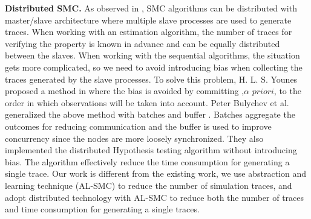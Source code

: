 \textbf{Distributed SMC.}
As observed in \cite{younes2005ymer}, SMC algorithms can be distributed with master/slave architecture where multiple slave processes are used to generate traces. When working with an estimation algorithm, the number of traces for verifying the property is known in advance and can be equally distributed between the slaves. When working with the sequential algorithms, the situation gets more complicated, so we need to avoid introducing bias when collecting the traces generated by the slave processes. To solve this problem, H. L. S. Younes proposed a method in \cite{Younes2004Planning} where the bias is avoided by committing ,$\alpha$ $priori$, to the order in which observations will be taken into account. Peter Bulychev et al. generalized the above method with batches and buffer \cite{Bulychev2012Checking}. Batches aggregate the outcomes for reducing communication and the buffer is used to improve concurrency since the nodes are more loosely synchronized. They also implemented the distributed Hypothesis testing algorithm without introducing bias. The algorithm effectively reduce the time consumption for generating a single trace. Our work is different from the existing work, we use abstraction and learning technique (AL-SMC) to reduce the number of simulation traces, and adopt distributed technology with AL-SMC to reduce both the number of traces and time consumption for generating a single traces.   